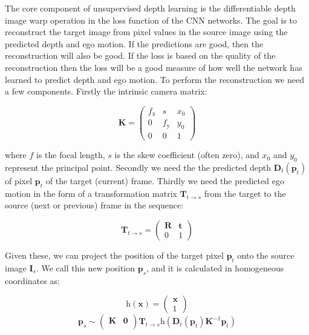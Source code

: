 The core component of unsupervised depth learning is the differentiable depth image warp operation in the loss function of the CNN networks. The goal is to reconstruct the target image from pixel values in the source image using the predicted depth and ego motion. If the predictions are good, then the reconstruction will also be good. If the loss is based on the quality of the reconstruction then the loss will be a good measure of how well the network has learned to predict depth and ego motion. To perform the reconstruction we need a few components\cite{Hartley2004}. Firstly the intrinsic camera matrix:

\begin{equation}
\textbf{K} = 
\begin{pmatrix}
f_\mathrm{x} & s & x_0 \\
0 & f_\mathrm{y} & y_0 \\
0 & 0   & 1
\end{pmatrix}
\end{equation}

where $f$ is the focal length, $s$ is the skew coefficient (often zero), and $x_0$ and $y_0$ represent the principal point. Secondly we need the the predicted depth $ \textbf{D}_t(\textbf{p}_t) $ of pixel $ \textbf{p}_t $ of the target (current) frame. Thirdly we need the predicted ego motion in the form of a transformation matrix $ \textbf{T}_{t \rightarrow s} $ from the target to the source (next or previous) frame in the sequence:

\begin{equation}
\textbf{T}_{t \rightarrow s} =
\begin{pmatrix}
\textbf{R} & \textbf{t} \\
0 & 1
\end{pmatrix}
\end{equation}

Given these, we can project the position of the target pixel $ \textbf{p}_t $ onto the source image $\textbf{I}_s$. We call this new position $ \textbf{p}_s $, and it is calculated in homogeneous coordinates as:

\begin{equation}
\text{h}(\textbf{x})=
\begin{pmatrix}
	\textbf{x}\\
	1
\end{pmatrix}
\end{equation}
\begin{equation}
\textbf{p}_s \sim 
\begin{pmatrix}
\textbf{K}  & \textbf{0} \\
\end{pmatrix}
\textbf{T}_{t \rightarrow s}
\text{h}(
\textbf{D}_t(\textbf{p}_t) \textbf{K}^{-1} \textbf{p}_t
)
\end{equation}

